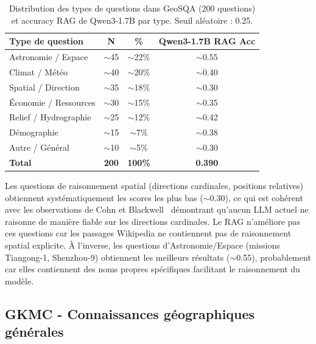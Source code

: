 \documentclass[12pt,a4paper]{article}
\begin{document}
\begin{table}[H]
\centering
\caption{Distribution des types de questions dans GeoSQA (200 questions) et 
accuracy RAG de Qwen3-1.7B par type. Seuil aléatoire : 0.25.}
\label{tab:types_questions}
\begin{tabular}{lccc}
\toprule
\textbf{Type de question} & \textbf{N} & \textbf{\%} & 
\textbf{Qwen3-1.7B RAG Acc} \\
\midrule
Astronomie / Espace    & $\sim$45 & $\sim$22\% & $\sim$0.55 \\
Climat / Météo         & $\sim$40 & $\sim$20\% & $\sim$0.40 \\
Spatial / Direction    & $\sim$35 & $\sim$18\% & $\sim$0.30 \\
Économie / Ressources  & $\sim$30 & $\sim$15\% & $\sim$0.35 \\
Relief / Hydrographie  & $\sim$25 & $\sim$12\% & $\sim$0.42 \\
Démographie            & $\sim$15 & $\sim$7\%  & $\sim$0.38 \\
Autre / Général        & $\sim$10 & $\sim$5\%  & $\sim$0.30 \\
\midrule
\textbf{Total}         & \textbf{200} & \textbf{100\%} & \textbf{0.390} \\
\bottomrule
\end{tabular}
\end{table}

Les questions de raisonnement spatial (directions cardinales, positions relatives) obtiennent systématiquement les scores les plus bas ($\sim$0.30), ce qui est cohérent avec les observations de Cohn et Blackwell~\cite{cohn_evaluating_2024} démontrant qu'aucun LLM actuel ne raisonne de manière fiable sur les directions cardinales. Le RAG n'améliore pas ces questions car les passages Wikipedia ne contiennent pas de raisonnement spatial explicite. À l'inverse, les questions d'Astronomie/Espace (missions Tiangong-1, Shenzhou-9) obtiennent les meilleurs résultats ($\sim$0.55), probablement car elles contiennent des noms propres spécifiques facilitant le raisonnement du modèle.

\subsection{GKMC - Connaissances g\'eographiques g\'en\'erales}
\end{document}
